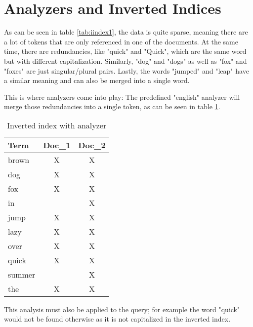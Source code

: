 \section{Analyzers and Inverted Indices}
As can be seen in table \ref{tab:iindex1}, the data is quite sparse, meaning there are a lot of tokens that are only referenced in one of the documents. At the same time, there are redundancies, like "quick" and "Quick", which are the same word but with different capitalization. Similarly, "dog" and "dogs" as well as "fox" and "foxes" are just singular/plural pairs. Lastly, the words "jumped" and "leap" have a similar meaning and can also be merged into a single word.

This is where analyzers come into play: The predefined "english" analyzer will merge those redundancies into a single token, as can be seen in table \ref{tab:iindex3}.

\begin{table}[H]
    \centering
    \begin{tabular}{ | l | c | c | }
        \hline
        Term    & Doc\_1 & Doc\_2 \\ \hline
        \hline
        brown   &   X   &  X  \\
        dog     &   X   &  X  \\
        fox     &   X   &  X  \\
        in      &       &  X  \\
        jump    &   X   &  X  \\
        lazy    &   X   &  X  \\
        over    &   X   &  X  \\
        quick   &   X   &  X  \\
        summer  &       &  X  \\
        the     &   X   &  X  \\
        \hline
    \end{tabular}
    \caption{Inverted index with analyzer \autocite{elasticsearch_iindex}}
    \label{tab:iindex3}
\end{table}

This analysis must also be applied to the query; for example the word "quick" would not be found otherwise as it is not capitalized in the inverted index.
